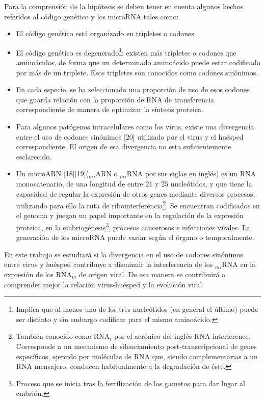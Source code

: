 \documentclass[12pt,a4paper,spanish]{article}
\begin{document}
\par Para la comprensión de la hipótesis se deben tener en cuenta algunos hechos referidos al código genético y los microRNA tales como:
\begin{itemize}
	\item El código genético está organizado en tripletes o codones.
	\item El código genético es degenerado\footnote{Implica que al menos uno de los tres nucleótidos (en general el último) puede ser distinto y sin 				embargo codificar para el mismo aminoácido.}: existen más tripletes o codones que aminoácidos, de forma que un determinado aminoácido puede 				estar codificado por más de un triplete. Esos tripletes son conocidos como codones sinónimos. 
	\item En cada especie, se ha seleccionado una proporción de uso de esos codones que guarda relación con la proporción de RNA de transferencia  				correspondiente de manera de optimizar la síntesis proteica.
	\item Para algunos patógenos intracelulares como los virus, existe una divergencia entre el uso de codones sinónimos [20] utilizado por el virus y el 			huésped	correspondiente. El origen de esa divergencia no esta suficientemente esclarecido.
	\item Un microARN [18][19]($_m$$_i$ARN o $_m$$_i$RNA por sus siglas en inglés) es un RNA monocatenario, de una longitud de entre 21 y 25 nucleótidos, 							y que tiene la capacidad de regular la expresión de otros genes mediante diversos procesos, utilizando para ello la ruta de 						ribointerferencia\footnote{También conocido como RNA$_i$ por el acrónico del inglés RNA interference. Corresponde a un mecanismo 							de silenciamiento post-transcripcional de genes específicos, ejercido por moléculas de RNA que, siendo complementarias a un RNA 						mensajero, conducen habitualmente a la degradación de éste.}. Se encuentran codificados en el genoma y juegan un papel importante 							en la regulación de la expresión proteica, en la embriogénesis\footnote{Proceso que se inicia tras la fertilización de los gametos 							para dar lugar al embrión.}, procesos cancerosos e infecciones virales. La generación de los microRNA puede variar según el 						órgano o temporalmente. 
\end{itemize}

\par En este trabajo se estudiará si la divergencia en el uso de codones sinónimos entre virus y huésped contribuye a disminuir la interferencia de los $_m$$_i$RNA en la expresión de los RNA$_m$ de origen viral. De esa manera se contribuirá a comprender mejor la relación virus-huésped y la evolución viral.
\end{document}
